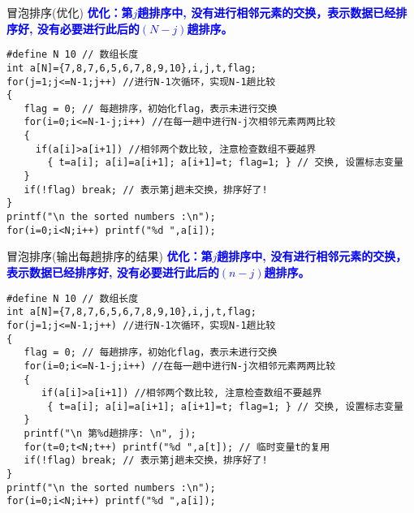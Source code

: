 \begin{frame}{冒泡排序(优化)}
\textbf{\textcolor{blue}{优化：第$j$趟排序中, 没有进行相邻元素的交换，表示数据已经排序好, 没有必要进行此后的$(N-j)$趟排序。}}
\begin{lstlisting}
#define N 10 // 数组长度
int a[N]={7,8,7,6,5,6,7,8,9,10},i,j,t,flag;
for(j=1;j<=N-1;j++) //进行N-1次循环，实现N-1趟比较
{
   flag = 0; // 每趟排序，初始化flag，表示未进行交换
   for(i=0;i<=N-1-j;i++) //在每一趟中进行N-j次相邻元素两两比较
   {
     if(a[i]>a[i+1]) //相邻两个数比较, 注意检查数组不要越界 
       { t=a[i]; a[i]=a[i+1]; a[i+1]=t; flag=1; } // 交换, 设置标志变量
   }
   if(!flag) break; // 表示第j趟未交换，排序好了!
}
printf("\n the sorted numbers :\n");
for(i=0;i<N;i++) printf("%d ",a[i]);
\end{lstlisting}
\end{frame}

\begin{frame}{冒泡排序(输出每趟排序的结果)}
\textbf{\textcolor{blue}{优化：第$j$趟排序中, 没有进行相邻元素的交换，表示数据已经排序好, 没有必要进行此后的$(n-j)$趟排序。}}
\begin{lstlisting}
#define N 10 // 数组长度
int a[N]={7,8,7,6,5,6,7,8,9,10},i,j,t,flag;
for(j=1;j<=N-1;j++) //进行N-1次循环，实现N-1趟比较
{
   flag = 0; // 每趟排序，初始化flag，表示未进行交换
   for(i=0;i<=N-1-j;i++) //在每一趟中进行N-j次相邻元素两两比较
   {
      if(a[i]>a[i+1]) //相邻两个数比较, 注意检查数组不要越界 
       { t=a[i]; a[i]=a[i+1]; a[i+1]=t; flag=1; } // 交换, 设置标志变量
   }
   printf("\n 第%d趟排序: \n", j);
   for(t=0;t<N;t++) printf("%d ",a[t]); // 临时变量t的复用
   if(!flag) break; // 表示第j趟未交换，排序好了!
}
printf("\n the sorted numbers :\n");
for(i=0;i<N;i++) printf("%d ",a[i]);
\end{lstlisting}
\end{frame}